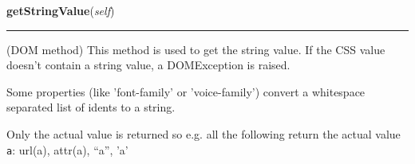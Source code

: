     \label{cssutils:css:cssvalue:CSSPrimitiveValue:getStringValue}

    \vspace{0.5ex}

\hspace{.8\funcindent}\begin{boxedminipage}{\funcwidth}

    \raggedright \textbf{getStringValue}(\textit{self})

    \vspace{-1.5ex}

    \rule{\textwidth}{0.5\fboxrule}
\setlength{\parskip}{2ex}

(DOM method) This method is used to get the string value. If the
CSS value doesn't contain a string value, a DOMException is raised.

Some properties (like 'font-family' or 'voice-family')
convert a whitespace separated list of idents to a string.

Only the actual value is returned so e.g. all the following return the
actual value \texttt{a}: url(a), attr(a), ``a'', 'a'
\setlength{\parskip}{1ex}
    \end{boxedminipage}

    \label{cssutils:css:cssvalue:CSSPrimitiveValue:setStringValue}

    \vspace{0.5ex}

